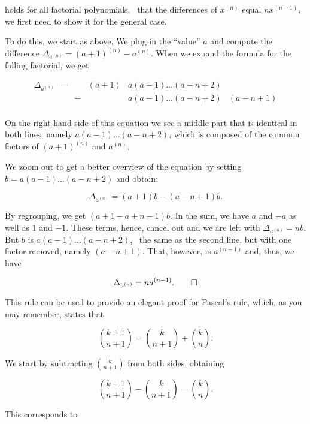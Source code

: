 \documentclass[tikz]{scrreprt}
\begin{document}
holds for all factorial polynomials,
\ie\ that the differences of $x^{(n)}$
equal $nx^{(n-1)}$,
we first need to show it for the general case.

To do this, we start as above. We plug in
the ``value'' $a$ and compute the difference
$\Delta_{a^{(n)}} = (a+1)^{(n)} - a^{(n)}$.
When we expand the
formula for the falling factorial, we get

\[
\begin{array}{lcclll}
\Delta_{a^{(n)}} & = &   & (a+1) & a(a-1)\dots(a-n+2) & \\
                 &   & - &       & a(a-1)\dots(a-n+2) & (a-n+1)\\
\end{array}
\]

On the right-hand side of this equation
we see a middle part that is identical
in both lines, namely $a(a-1)\dots(a-n+2)$,
which is composed of the common factors of
$(a+1)^{(n)}$ and $a^{(n)}$.

We zoom out to get a better overview of the equation
by setting $b=a(a-1)\dots(a-n+2)$ and obtain:

\begin{equation}
  \Delta_{a^{(n)}} = (a+1)b - (a-n+1)b.
\end{equation}

By regrouping, we get $(a+1-a+n-1)b$.
In the sum, we have $a$ and $-a$ as well as 1 and $-1$.
These terms, hence, cancel out and we are left with
$\Delta_{a^{(n)}} = nb$.
But $b$ is $a(a-1)\dots(a-n+2)$, \ie\ the same
as the second line, but with one factor removed, namely
$(a-n+1)$. That, however, is $a^{(n-1)}$ and, thus,
we have

\begin{equation}
  \Delta_{a^{(n)}} = na^{(n-1)}.\qed
\end{equation}

This rule can be used to provide an elegant proof
for Pascal's rule, which, as you may remember,
states that

\begin{equation}
\binom{k+1}{n+1} = \binom{k}{n+1} + \binom{k}{n}.
\end{equation}

We start by subtracting $\binom{k}{n+1}$
from both sides, obtaining

\begin{equation}
\binom{k+1}{n+1} - \binom{k}{n+1} = \binom{k}{n}.
\end{equation}

This corresponds to
\end{document}
